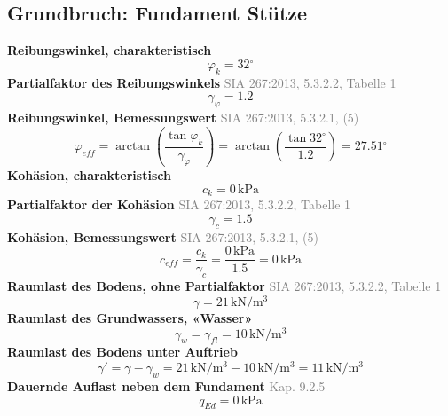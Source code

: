 \documentclass[11pt,a4paper]{article}
\newcommand{\normref}[1]{{\small\textcolor{gray}{#1}}}
\begin{document}
\subsection{Grundbruch: Fundament Stütze}
\noindent\textbf{Reibungswinkel, charakteristisch}
\begin{equation*}
\varphi_k = 32{}^{\circ}
\end{equation*}
\noindent\textbf{Partialfaktor des Reibungswinkels} \hfill \normref{SIA 267:2013, 5.3.2.2, Tabelle 1}
\begin{equation*}
\gamma_{\varphi} = 1.2
\end{equation*}
\noindent\textbf{Reibungswinkel, Bemessungswert} \hfill \normref{SIA 267:2013, 5.3.2.1, (5)}
\begin{equation*}
\varphi_{eff} = \arctan\left(\frac{\tan \varphi_k}{\gamma_{\varphi}}\right) = \arctan\left(\frac{\tan 32{}^{\circ}}{1.2}\right) = 27.51{}^{\circ}
\end{equation*}
\noindent\textbf{Kohäsion, charakteristisch}
\begin{equation*}
c_k = 0\,\mathrm{kPa}
\end{equation*}
\noindent\textbf{Partialfaktor der Kohäsion} \hfill \normref{SIA 267:2013, 5.3.2.2, Tabelle 1}
\begin{equation*}
\gamma_c = 1.5
\end{equation*}
\noindent\textbf{Kohäsion, Bemessungswert} \hfill \normref{SIA 267:2013, 5.3.2.1, (5)}
\begin{equation*}
c_{eff} = \frac{c_k}{\gamma_c} = \frac{0\,\mathrm{kPa}}{1.5} = 0\,\mathrm{kPa}
\end{equation*}
\noindent\textbf{Raumlast des Bodens, ohne Partialfaktor} \hfill \normref{SIA 267:2013, 5.3.2.2, Tabelle 1}
\begin{equation*}
\gamma = 21\,\mathrm{kN}/\mathrm{m}^{3}
\end{equation*}
\noindent\textbf{Raumlast des Grundwassers, «Wasser»}
\begin{equation*}
\gamma_w = \gamma_{fl} = 10\,\mathrm{kN}/\mathrm{m}^{3}
\end{equation*}
\noindent\textbf{Raumlast des Bodens unter Auftrieb}
\begin{equation*}
\gamma' = \gamma - \gamma_w = 21\,\mathrm{kN}/\mathrm{m}^{3} - 10\,\mathrm{kN}/\mathrm{m}^{3} = 11\,\mathrm{kN}/\mathrm{m}^{3}
\end{equation*}
\noindent\textbf{Dauernde Auflast neben dem Fundament} \hfill \normref{Kap. 9.2.5}
\begin{equation*}
q_{Ed} = 0\,\mathrm{kPa}
\end{equation*}
\end{document}
